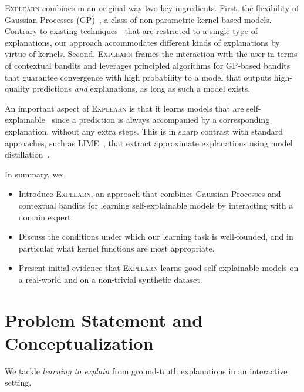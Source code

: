 \documentclass[letterpaper]{article} %
\newcommand{\explearn}{\textsc{Explearn}\xspace}
\begin{document}
\explearn combines in an original way two key ingredients.
%
First, the flexibility of Gaussian Processes (GP)~\cite{rasmussen2006gaussian}, a class of non-parametric kernel-based models.  Contrary to existing techniques~\cite{teso2019explanatory,schramowski2020right,lertvittayakumjorn2020find} that are restricted to a single type of explanations, our approach accommodates different kinds of explanations by virtue of kernels.
Second, \explearn frames the interaction with the user in terms of contextual bandits and leverages principled algorithms for GP-based bandits~\cite{krause2011contextual} that guarantee convergence with high probability to a model that outputs high-quality predictions \emph{and} explanations, as long as such a model exists.

An important aspect of \explearn is that
it learns models that are self-explainable~\cite{alvarez2018towards} since a prediction is always accompanied by a corresponding explanation, without any extra steps. This is in sharp contrast with standard approaches, such as LIME~\cite{ribeiro2016should}, that extract approximate explanations using model distillation~\cite{bucilua2006model}.


In summary, we:
%
\begin{itemize}

    \item Introduce \explearn, an approach that combines Gaussian Processes and contextual bandits for learning self-explainable models by interacting with a domain expert.

    \item Discuss the conditions under which our learning task is well-founded, and in particular what kernel functions are most appropriate.

    \item Present initial evidence that \explearn learns good self-explainable models on a real-world and on a non-trivial synthetic dataset.

\end{itemize}



\section{Problem Statement and Conceptualization}
\label{sec:preliminaries}

We tackle \emph{learning to explain} from ground-truth explanations in an interactive setting.  %
\end{document}
